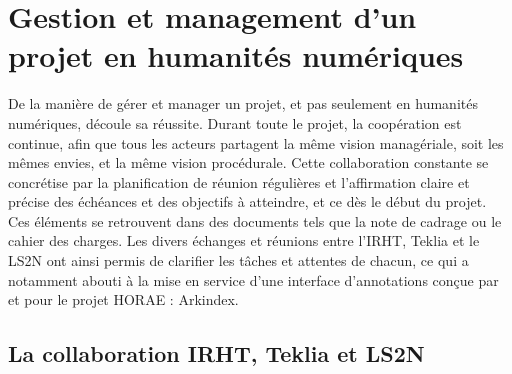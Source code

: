 \documentclass[a4paper,12pt,twoside]{book}
\begin{document}
	
	\section{\label{gestion_management}Gestion et management d’un projet en humanités numériques}
	
	De la manière de gérer et manager un projet, et pas seulement en humanités numériques, découle sa réussite. Durant toute le projet, la coopération est continue, afin que tous les acteurs partagent la même vision managériale, soit les mêmes envies, et la même vision procédurale. Cette collaboration constante se concrétise par la planification de réunion régulières et l'affirmation claire et précise des échéances et des objectifs à atteindre, et ce dès le début du projet. Ces éléments se retrouvent dans des documents tels que la note de cadrage ou le cahier des charges. Les divers échanges et réunions entre l'IRHT, Teklia et le LS2N ont ainsi permis de clarifier les tâches et attentes de chacun, ce qui a notamment abouti à la mise en service d'une interface d'annotations conçue par et pour le projet HORAE : Arkindex. 
	
	\subsection{La collaboration IRHT, Teklia et LS2N}
	
\end{document}
